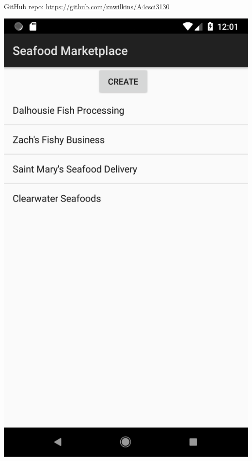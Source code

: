 \documentclass[12pt]{article}
\newenvironment{centre} {\begin{center}} {\end{center}}
\begin{document}
GitHub repo: \url{https://github.com/znwilkins/A4csci3130}

\hfill \break
\begin{centre}
\includegraphics[scale=0.5]{running}
\end{centre}
\end{document}
